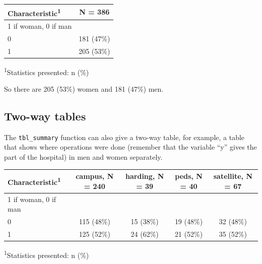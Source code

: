 \documentclass[]{book}
\newenvironment{Shaded}{\begin{snugshade}}{\end{snugshade}}
\newcommand{\CommentTok}[1]{\textcolor[rgb]{0.56,0.35,0.01}{\textit{#1}}}
\newcommand{\DataTypeTok}[1]{\textcolor[rgb]{0.13,0.29,0.53}{#1}}
\newcommand{\KeywordTok}[1]{\textcolor[rgb]{0.13,0.29,0.53}{\textbf{#1}}}
\newcommand{\NormalTok}[1]{#1}
\newcommand{\OperatorTok}[1]{\textcolor[rgb]{0.81,0.36,0.00}{\textbf{#1}}}
\newcommand{\StringTok}[1]{\textcolor[rgb]{0.31,0.60,0.02}{#1}}
\begin{document}
\captionsetup[table]{labelformat=empty,skip=1pt}
\begin{longtable}{lc}
\toprule
\textbf{Characteristic}\textsuperscript{1} & \textbf{N = 386} \\ 
\midrule
1 if woman, 0 if man &  \\ 
0 & 181 (47\%) \\ 
1 & 205 (53\%) \\ 
\bottomrule
\end{longtable}
\vspace{-5mm}
\begin{minipage}{\linewidth}
\textsuperscript{1}Statistics presented: n (\%) \\ 
\end{minipage}

So there are 205 (53\%) women and 181 (47\%) men.

\hypertarget{two-way-tables}{%
\subsection{Two-way tables}\label{two-way-tables}}

The \texttt{tbl\_summary} function can also give a two-way table, for
example, a table that shows where operations were done (remember that
the variable ``y'' gives the part of the hospital) in men and women
separately.

\begin{Shaded}
\end{Shaded}

\captionsetup[table]{labelformat=empty,skip=1pt}
\begin{longtable}{lcccc}
\toprule
\textbf{Characteristic}\textsuperscript{1} & \textbf{campus}, N = 240 & \textbf{harding}, N = 39 & \textbf{peds}, N = 40 & \textbf{satellite}, N = 67 \\ 
\midrule
1 if woman, 0 if man &  &  &  &  \\ 
0 & 115 (48\%) & 15 (38\%) & 19 (48\%) & 32 (48\%) \\ 
1 & 125 (52\%) & 24 (62\%) & 21 (52\%) & 35 (52\%) \\ 
\bottomrule
\end{longtable}
\vspace{-5mm}
\begin{minipage}{\linewidth}
\textsuperscript{1}Statistics presented: n (\%) \\ 
\end{minipage}
\end{document}
